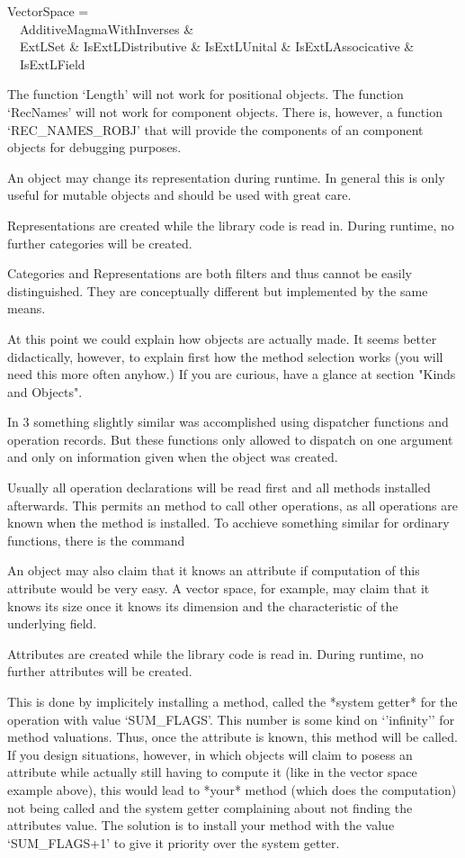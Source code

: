 VectorSpace = \\
\ \ AdditiveMagmaWithInverses \& \\
\ \ ExtLSet \& IsExtLDistributive \& IsExtLUnital \& IsExtLAssocicative \& \\
\ \ IsExtLField


\danger
The function `Length' will not work for positional objects. The function
`RecNames' will not work for component objects. There is, however, a
function `REC_NAMES_ROBJ' that will provide the components of an component
objects for debugging purposes.


\danger
An object may change its representation during runtime. In general this is
only useful for mutable objects and should be used with great care.


\danger
Representations are created while the library code is read in. During runtime,
no further categories will be created.


\danger
Categories and Representations are both filters and thus cannot be easily
distinguished. They are conceptually different but implemented by the same
means.

At this point we could explain how objects are actually made. It seems
better didactically, however, to explain first how the method selection
works (you will need this more often anyhow.) If you are curious, have a
glance at section "Kinds and Objects".


\danger
In {\GAP} 3 something slightly similar was accomplished using dispatcher
functions and operation records. But these functions only allowed to
dispatch on one argument and only on information given when the object was
created.

Usually all operation declarations will be read first and all methods
installed afterwards. This permits an method to call other operations, as
all operations are known when the method is installed. To acchieve something
similar for ordinary functions, there is the command


\danger
An object may also claim that it knows an attribute if computation of this
attribute would be very easy. A vector space, for example, may claim that
it knows its size once it knows its dimension and the characteristic of the
underlying field. 


\danger
Attributes are created while the library code is read in. During runtime, no
further attributes will be created.


\danger
This is done by implicitely installing a method, called the *system getter*
for the operation with value `SUM_FLAGS'. This number is some kind on
`'infinity'' for method valuations. Thus, once the attribute is known, this
method will be called. If you design situations, however, in
which objects will claim to posess an attribute while actually still having
to compute it (like in the vector space example above), this would lead to
*your* method (which does the computation) not being called and the system
getter complaining about not finding the attributes value. The solution is 
to install your method with the value `SUM_FLAGS+1' to give it priority
over the system getter.


